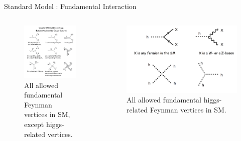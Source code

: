 \documentclass[mathserif,serif]{beamer}
\begin{document}
\begin{frame}{Standard Model : Fundamental Interaction}
\begin{columns}

\begin{column}{0.5\textwidth}
\begin{figure}
\centering
\includegraphics[width=\textwidth]{data/photo/theory/vertices_SM.png}
\caption{All allowed fundamental Feynman vertices in SM, except higgs-related vertices.}
\end{figure}

\end{column}

\begin{column}{0.5\textwidth}
\begin{figure}
\centering
\includegraphics[width=\textwidth]{data/photo/theory/vertices_higgs.png}
\caption{All allowed fundamental higgs-related Feynman vertices in SM.}
\end{figure}
\end{column}

\end{columns}
\end{frame}
\end{document}
